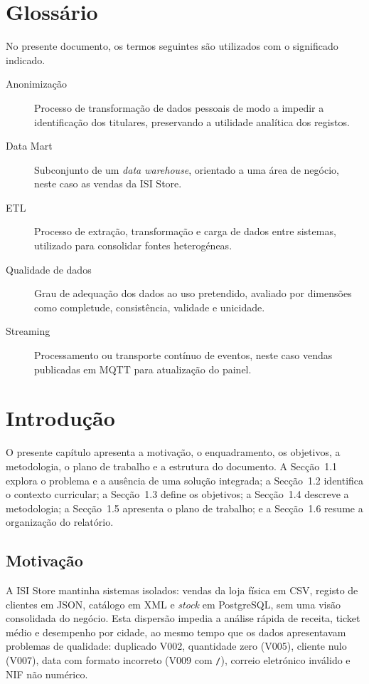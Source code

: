 \documentclass[11pt,a4paper]{article}
\begin{document}
\section*{Glossário}
No presente documento, os termos seguintes são utilizados com o significado indicado.
\begin{description}
\item[Anonimização] Processo de transformação de dados pessoais de modo a impedir a identificação dos titulares, preservando a utilidade analítica dos registos.
\item[Data Mart] Subconjunto de um \textit{data warehouse}, orientado a uma área de negócio, neste caso as vendas da ISI Store.
\item[ETL] Processo de extração, transformação e carga de dados entre sistemas, utilizado para consolidar fontes heterogéneas.
\item[Qualidade de dados] Grau de adequação dos dados ao uso pretendido, avaliado por dimensões como completude, consistência, validade e unicidade.
\item[Streaming] Processamento ou transporte contínuo de eventos, neste caso vendas publicadas em MQTT para atualização do painel.
\end{description}

\clearpage

\tableofcontents
\clearpage
\listoffigures
\clearpage
\listoftables
\clearpage
\lstlistoflistings

\section{Introdução}
O presente capítulo apresenta a motivação, o enquadramento, os objetivos, a metodologia, o plano de trabalho e a estrutura do documento. A Secção~1.1 explora o problema e a ausência de uma solução integrada; a Secção~1.2 identifica o contexto curricular; a Secção~1.3 define os objetivos; a Secção~1.4 descreve a metodologia; a Secção~1.5 apresenta o plano de trabalho; e a Secção~1.6 resume a organização do relatório.

\subsection{Motivação}
A ISI Store mantinha sistemas isolados: vendas da loja física em CSV, registo de clientes em JSON, catálogo em XML e \textit{stock} em PostgreSQL, sem uma visão consolidada do negócio. Esta dispersão impedia a análise rápida de receita, ticket médio e desempenho por cidade, ao mesmo tempo que os dados apresentavam problemas de qualidade: duplicado V002, quantidade zero (V005), cliente nulo (V007), data com formato incorreto (V009 com \texttt{/}), correio eletrónico inválido e NIF não numérico.
\end{document}
